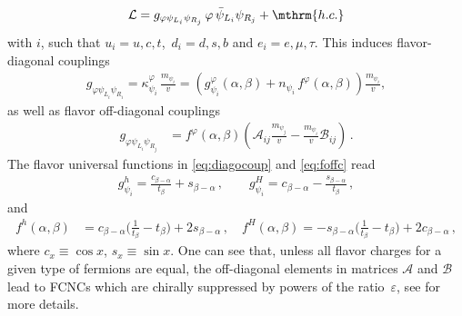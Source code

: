 \begin{equation}\label{eq:newlagrangian}
\mathcal{L}= g_{\varphi \psi_{L_i} \psi_{R_j} }\, \varphi \,\bar \psi_{L_i} \psi_{R_j}+\mthrm{h.c.}
\end{equation}
with $i$, such that $u_i=u, c,t$,\,  $d_i=d,s,b$ and $e_i=e,\mu,\tau$. This induces 
flavor-diagonal couplings 
\begin{align}\label{eq:diagocoup}
g_{\varphi \psi_{L_i}\psi_{R_i}}= \kappa^\varphi_{\psi_i}\, \frac{m_{\psi_i}}{v} =\left(g^{\varphi}_{\psi_i}(\alpha,\beta)+n_{\psi_i}\, f^\varphi(\alpha, \beta)\right)\frac{m_{\psi_i}}{v},
\end{align}
as well as flavor off-diagonal couplings
 \begin{align}\label{eq:foffc}
g_{\varphi \psi_{L_i}\psi_{R_j}}&=  f^\varphi(\alpha, \beta)\left(\mathcal{A}_{ij}\frac{m_{\psi_j}}{v}-\frac{m_{\psi_i}}{v}\mathcal{B}_{ij} \right)\,.
\end{align}
The flavor universal functions in \eqref{eq:diagocoup} and \eqref{eq:foffc} read
\begin{align}
g^h_{\psi_i}=\frac{c_{\beta-\alpha}}{t_\beta}+s_{\beta-\alpha}\,,\qquad g^H_{\psi_i}=c_{\beta-\alpha}-\frac{s_{\beta-\alpha}}{t_\beta}\,,
\end{align}
and
\begin{align}\label{eq:fFs}
f^h(\alpha,\beta)&=c_{\beta-\alpha}\Big(\frac{1}{t_\beta}-t_\beta\Big)+2s_{\beta-\alpha}\,,\quad f^H(\alpha,\beta)=-s_{\beta-\alpha}\Big(\frac{1}{t_\beta}-t_\beta\Big)+2c_{\beta-\alpha}\,,
\end{align}
where $c_{x}\equiv \cos x$, $s_x\equiv \sin x$. One can see that, unless all flavor charges for a given type of fermions are equal, the off-diagonal elements in matrices $\mathcal{A}$ and $\mathcal{B}$ lead to FCNCs which are chirally suppressed by powers of the ratio~$\varepsilon$, see \cite{Bauer:2017cov} for more details.


